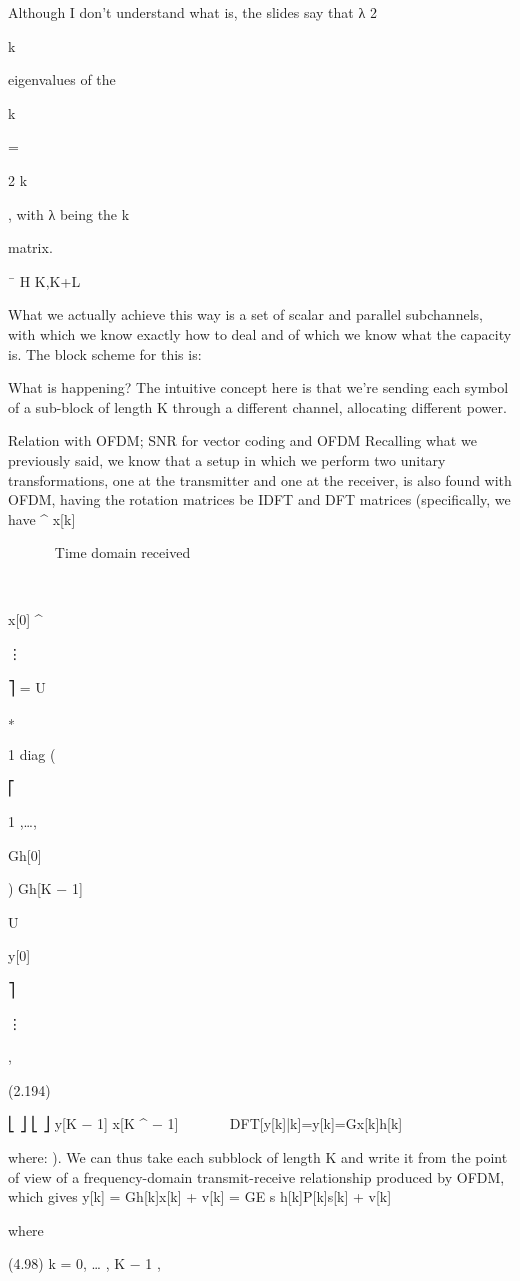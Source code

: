 {{{{{Although I don't understand what \sigma is, the slides say that λ 2

k

eigenvalues of the

k

= \sigma

2 k

, with λ being the k

matrix.

¯
H K,K+L

What we actually achieve this way is a set of scalar and parallel subchannels, with which we know exactly how to deal and of which we know what the capacity is.
The block scheme for this is:

​What is happening?
The intuitive concept here is that we're sending each symbol of a sub-block of length K through a different channel, allocating different power.

Relation with OFDM; SNR for vector coding and OFDM Recalling what we previously said, we know that a setup in which we perform two unitary transformations, one at the transmitter and one at the receiver, is also found with OFDM, having the rotation matrices be IDFT and DFT matrices (specifically, we have
^
x[k]






Time domain received






⎡

x[0]
^

⋮

⎤
= U

∗

1 diag (

⎡

1
,…,

\sqrt Gh[0]

)
\sqrt Gh[K − 1]

U

y[0]

⎤

⋮

,

(2.194)

⎣
⎦
⎣
⎦
y[K − 1]
x[K
^
− 1]





DFT[y[k]|k]=y[k]=\sqrt Gx[k]h[k]

where:
).
We can thus take each subblock of length K and write it from the point of view of a frequency-domain transmit-receive relationship produced by OFDM, which gives y[k] = \sqrt Gh[k]x[k] + v[k]
= \sqrt GE s h[k]\sqrt P[k]s[k] + v[k]

where

(4.98)
k = 0, … , K − 1 ,

}}}}}
